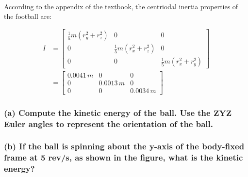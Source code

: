 \documentclass[12pt, letterpaper]{../assignment}
\begin{document}
According to the appendix of the textbook,
the centriodal inertia properties of the football are:

\begin{equation*}
  \begin{aligned}
    I
    &= \left[\begin{array}{ccc}
      \frac{1}{5} m (r_y^2+r_z^2) & 0 & 0\\
      0 & \frac{1}{5} m (r_x^2+r_z^2) & 0\\
      0 & 0 & \frac{1}{5} m (r_x^2+r_y^2)
      \end{array}\right]\\
    &= \left[\begin{array}{ccc}
            0.0041\,m & 0 & 0\\
            0 & 0.0013\,m & 0\\
            0 & 0 & 0.0034\,m
            \end{array}\right]
  \end{aligned}
\end{equation*}

\subsubsection*{(a) Compute the kinetic energy of the ball.
Use the $\bm{ZYZ}$ Euler angles to represent the orientation of the ball.}


\subsubsection*{(b) If the ball is spinning about the y-axis of the body-fixed frame at 5 rev/s,
as shown in the figure,
what is the kinetic energy?}


 

\end{document}
